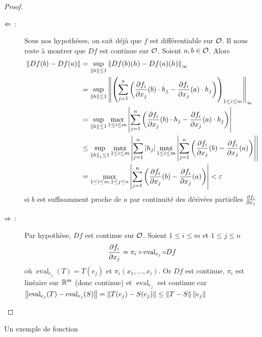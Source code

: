 \begin{proof}
    \begin{description}
        \item[$\Leftarrow$ : ]Sous nos hypothèses, on sait déjà que $f$ est différentiable sur $\mathcal{O}$. Il nous reste à montrer que $Df$ est continue sur $\mathcal{O}$. Soient $a,b\in\mathcal{O}$. Alors 
        \begin{align*}
            \left\| Df(b)-Df(a) \right\|&=\sup_{\left\| h \right\|\leq 1}\left\| Df(b)(h)-Df(a)(h) \right\|_\infty\\
            &=\sup_{\left\| h \right\|\leq 1}\left\| \left( \sum_{j=1}^n\bigg(\frac{\partial f_i}{\partial x_j}(b)\cdot h_j-\frac{\partial f_i}{\partial x_j}(a)\cdot h_j\bigg)\right)_{1\leq i \leq m} \right\|_\infty\\
            &= \sup_{\left\| h \right\|\leq 1}\max_{1\leq i\leq m}\left| \sum_{j=1}^n\bigg(\frac{\partial f_i}{\partial x_j}(b)\cdot h_j-\frac{\partial f_i}{\partial x_j}(a)\cdot h_j\bigg) \right|\\
            &\leq \sup_{\left\| h \right\|_1\leq 1}\max_{1\leq i\leq m}\left| \sum_{j=1}^n\left| h_j \right|\max_{1\leq i\leq m}\left| \sum_{j=1}^n\bigg(\frac{\partial f_i}{\partial x_j}(b)-\frac{\partial f_i}{\partial x_j}(a)\bigg) \right| \right|\\
            &= \max_{1\leq i\leq m, 1\leq j \leq n}\left| \sum_{j=1}^n\bigg(\frac{\partial f_i}{\partial x_j}(b)-\frac{\partial f_i}{\partial x_j}(a)\bigg) \right| <\varepsilon  
        \end{align*} 
        si $b$ est suffisamment proche de $a$ par continuité des dérivées partielles $\frac{\partial f_i}{\partial x_j}$
        \item[$\Rightarrow$ : ] Par hypothèse, $Df$ est continue sur $\mathcal{O}$. Soient $1\leq i\leq m$ et $1\leq j\leq n$
        \begin{align*}
            \frac{\partial f_ i}{\partial x_ j}=\pi_i\circ \operatorname{eval}_{e_j}\circ Df
        \end{align*}
        où $\operatorname{eval}_{e_j}(T)=T(e_j)$ et $\pi_i(x_1,\dotsc,x_i)$. 
        Or $Df$ est continue, $\pi_i$ est linéaire sur $\mathbb{R}^m$ (donc continue) et $\operatorname{eval}_{e_j}$ est continue car $\left\| \operatorname{eval}_{e_j}(T)-\operatorname{eval}_{e_j}(S) \right\| = \left\| T(e_j)-S(e_j) \right\|\leq \left\| T-S \right\|\left\| e_j \right\|$
    \end{description}
\end{proof}
\begin{exemple}
    Un exemple de fonction 
\end{exemple}
